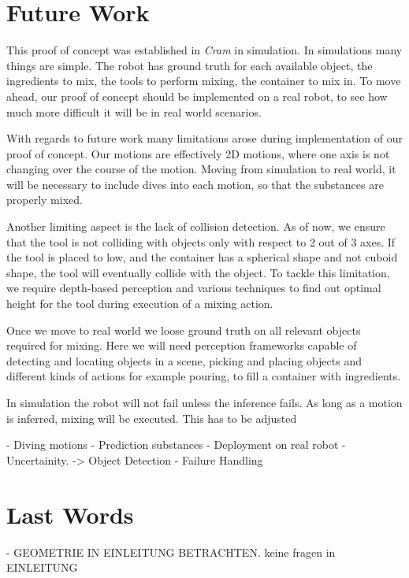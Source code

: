 \section{Future Work}
This proof of concept was established in \textit{Cram} in simulation. In simulations many things are simple.
The robot has ground truth for each available object, the ingredients to mix, the tools to perform mixing, the container to mix in. 
To move ahead, our proof of concept should be implemented on a real robot, to see how much more difficult it will 
be in real world scenarios.

With regards to future work many limitations arose during implementation of our proof of concept.
Our motions are effectively 2D motions, where one axis is not changing over the course of the motion.
Moving from simulation to real world, it will be necessary to include dives into each motion, so that 
the substances are properly mixed. 

Another limiting aspect is the lack of collision detection. As of now, we ensure that the tool is not colliding 
with objects only with respect to 2 out of 3 axes. If the tool is placed to low, and the container has a spherical shape and not 
cuboid shape, the tool will eventually collide with the object. To tackle this limitation, we require depth-based perception
and various techniques to find out optimal height for the tool during execution of a mixing action.

Once we move to real world we loose ground truth on all relevant objects required for mixing.
Here we will need perception frameworks capable of detecting and locating objects in a scene, 
picking and placing objects and different kinds of actions for example pouring, to fill a container
with ingredients.

In simulation the robot will not fail unless the inference fails. As long as a motion is inferred, mixing will be executed.
This has to be adjusted



- Diving motions
- Prediction substances
- Deployment on real robot
- Uncertainity. -> Object Detection
- Failure Handling

\section{Last Words}

- GEOMETRIE IN EINLEITUNG BETRACHTEN.
keine fragen in EINLEITUNG